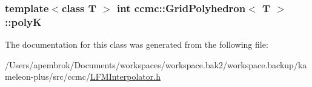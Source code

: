 \hypertarget{classccmc_1_1_grid_polyhedron_a2d84c3c8aa5821be3888d1bb636d2224}{
\subsubsection[{poly\-K}]{\setlength{\rightskip}{0pt plus 5cm}template$<$class T $>$ int {\bf ccmc\-::\-Grid\-Polyhedron}$<$ T $>$\-::poly\-K}}\label{classccmc_1_1_grid_polyhedron_a2d84c3c8aa5821be3888d1bb636d2224}


The documentation for this class was generated from the following file\-:\begin{DoxyCompactItemize}
\item 
/\-Users/apembrok/\-Documents/workspaces/workspace.\-bak2/workspace.\-backup/kameleon-\/plus/src/ccmc/\hyperlink{_l_f_m_interpolator_8h}{L\-F\-M\-Interpolator.\-h}\end{DoxyCompactItemize}
